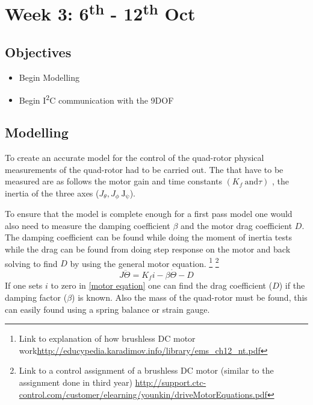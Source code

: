 \chapter{Week 3: 6\textsuperscript{th}  - 12\textsuperscript{th} Oct}
 \tocless\section{Objectives}
\begin{itemize}
	\item Begin Modelling
	\item Begin I\textsuperscript{2}C communication with the 9DOF
\end{itemize}


 \tocless\section{Modelling}
To create an accurate model for the control of the quad-rotor physical measurements of the quad-rotor had to be carried out. The that have to be measured are as follows the motor gain and time constants $(K_f  ~\mathrm{and} \tau)$ , the inertia of the three axes ($J_{\theta},J_{\phi}~ \mathrm{J_{\psi}}$). 

To ensure that the model is complete enough for a first pass model one would also need to measure the damping coefficient $\beta$ and the motor drag coefficient $D$. The damping coefficient can be found while doing the moment of inertia tests while the drag can be found from doing step response on the motor and back solving to find $D$ by using the general motor equation.  \footnote{Link to explanation of how brushless DC motor work\url{http://educypedia.karadimov.info/library/ems_ch12_nt.pdf}} \footnote{Link to a control assignment of a brushless DC motor (similar to the assignment done in third year) \url{http://support.ctc-control.com/customer/elearning/younkin/driveMotorEquations.pdf}}
\begin{equation}
	J\ddot{\Theta} = K_f i - \beta \dot{\Theta} - D
	\label{motor eqation}
\end{equation}
If one sets $i$ to zero in \eqref{motor eqation} one can find the drag coefficient ($D$) if the damping factor ($\beta$) is known.
Also the mass of the quad-rotor must be found, this can easily found using a spring balance or strain gauge.

